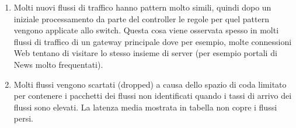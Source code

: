 \begin{enumerate}
  \item Molti nuovi flussi di traffico hanno pattern molto simili, quindi dopo un iniziale processamento da parte del controller le regole per quel pattern vengono applicate allo switch. Questa cosa viene osservata spesso in molti flussi di traffico di un gateway principale dove per esempio, molte connessioni Web tentano di visitare lo stesso insieme di server (per esempio portali di News molto frequentati).
  \item Molti flussi vengono scartati (dropped) a causa dello spazio di coda limitato per contenere i pacchetti dei flussi non identificati quando i tassi di arrivo dei flussi sono elevati. La latenza media mostrata in tabella non copre i flussi persi.
\end{enumerate}


